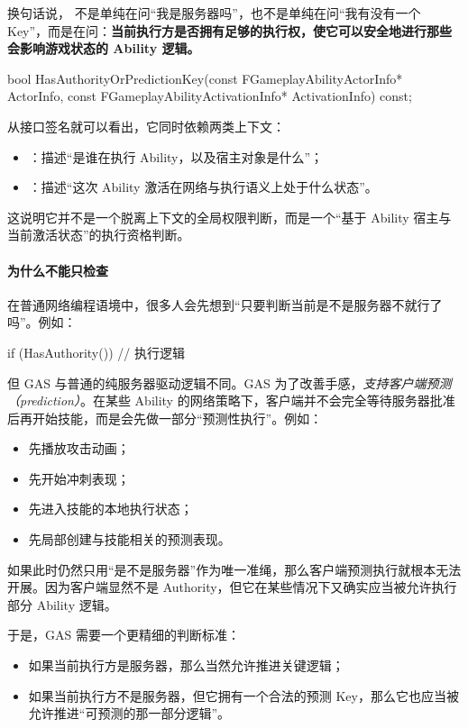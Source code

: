 换句话说， 不是单纯在问“我是服务器吗”，也不是单纯在问“我有没有一个 Key”，而是在问：\textbf{当前执行方是否拥有足够的执行权，使它可以安全地进行那些会影响游戏状态的 Ability 逻辑。}
\begin{code}[caption={函数声明:\texttt{HasAuthorityOrPredictionKey}}]
	bool HasAuthorityOrPredictionKey(const FGameplayAbilityActorInfo* ActorInfo, 
	const FGameplayAbilityActivationInfo* ActivationInfo) const;
\end{code}
从接口签名就可以看出，它同时依赖两类上下文：
\begin{itemize}
	\item {}：描述“是谁在执行 Ability，以及宿主对象是什么”；
	\item {}：描述“这次 Ability 激活在网络与执行语义上处于什么状态”。
\end{itemize}

这说明它并不是一个脱离上下文的全局权限判断，而是一个“基于 Ability 宿主与当前激活状态”的执行资格判断。

\paragraph{为什么不能只检查 }

在普通网络编程语境中，很多人会先想到“只要判断当前是不是服务器不就行了吗”。例如：
\begin{code}
	if (HasAuthority()) {
		// 执行逻辑
	}
\end{code}
但 GAS 与普通的纯服务器驱动逻辑不同。GAS 为了改善手感，\emph{支持客户端预测（prediction）}。在某些 Ability 的网络策略下，客户端并不会完全等待服务器批准后再开始技能，而是会先做一部分“预测性执行”。例如：

\begin{itemize}
	\item 先播放攻击动画；
	\item 先开始冲刺表现；
	\item 先进入技能的本地执行状态；
	\item 先局部创建与技能相关的预测表现。
\end{itemize}

如果此时仍然只用“是不是服务器”作为唯一准绳，那么客户端预测执行就根本无法开展。因为客户端显然不是 Authority，但它在某些情况下又确实应当被允许执行部分 Ability 逻辑。

于是，GAS 需要一个更精细的判断标准：
\begin{itemize}
	\item 如果当前执行方是服务器，那么当然允许推进关键逻辑；
	\item 如果当前执行方不是服务器，但它拥有一个合法的预测 Key，那么它也应当被允许推进“可预测的那一部分逻辑”。
\end{itemize}

